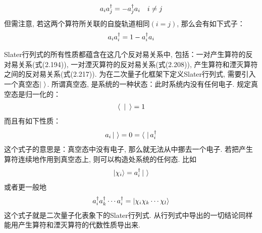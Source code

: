 \begin{align}
a_ia^\dagger_j = -a^\dagger_ja_i\quad i\neq j
\end{align}
但需注意, 若这两个算符所关联的自旋轨道相同$(i=j)$, 那么会有如下式子：
\begin{align}
a_ia^\dagger_i = 1 -a^\dagger_ia_i
\end{align}

Slater行列式的所有性质都蕴含在这几个反对易关系中, 包括：一对产生算符的反对易关系(式(2.194)), 一对湮灭算符的反对易关系(式(2.208)), 产生算符和湮灭算符之间的反对易关系(式(2.217)). 为在二次量子化框架下定义Slater行列式, 需要引入一个真空态$\Ket{\,\,}$. 所谓真空态, 是系统的一种状态：此时系统内没有任何电子. 规定真空态是归一化的：
\begin{align}
\Braket{\,\,|\,\,} = 1
\end{align} 
而且有如下性质：
\begin{align}
a_i \Ket{\,\,} = 0 = \Bra{\,\,} a^\dagger_i
\end{align}
这个式子的意思是：真空态中没有电子, 那么就无法从中挪去一个电子. 若把产生算符连续地作用到真空态上, 则可以构造处系统的任何态. 比如
\begin{align}
\Ket{\chi_i} = a^\dagger_i\Ket{\,\,}
\end{align}
或者更一般地
\begin{align}
a^\dagger_ia^\dagger_k\cdots a^\dagger_i = \Ket{\chi_i\chi_k\cdots\chi_l}
\end{align}
这个式子就是二次量子化表象下的Slater行列式. 从行列式中导出的一切结论同样能用产生算符和湮灭算符的代数性质导出来. 

